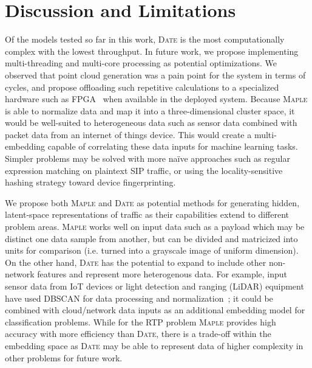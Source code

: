 \section{Discussion and Limitations}

Of the models tested so far in this work, \textsc{Date} is the most computationally complex with the lowest throughput. In future work, we propose implementing multi-threading and multi-core processing as potential optimizations. We observed that point cloud generation was a pain point for the system in terms of cycles, and propose offloading such repetitive calculations to a specialized hardware such as FPGA~\cite{Song2005EfficientPC} when available in the deployed system. Because \textsc{Maple} is able to normalize data and map it into a three-dimensional cluster space, it would be well-suited to heterogeneous data such as sensor data combined with packet data from an internet of things device. This would create a multi-embedding capable of correlating these data inputs for machine learning tasks. Simpler problems may be solved with more naïve approaches such as regular expression matching on plaintext SIP traffic, or using the locality-sensitive hashing strategy toward device fingerprinting.

We propose both \textsc{Maple} and \textsc{Date} as potential methods for generating hidden, latent-space representations of traffic as their capabilities extend to different problem areas. \textsc{Maple} works well on input data such as a payload which may be distinct one data sample from another, but can be divided and matricized into units for comparison (i.e. turned into a grayscale image of uniform dimension). On the other hand, \textsc{Date} has the potential to expand to include other non-network features and represent more heterogenous data. For example, input sensor data from IoT devices or light detection and ranging (LiDAR) equipment have used DBSCAN for data processing and normalization~\cite{wanglidar2019}; it could be combined with cloud/network data inputs as an additional embedding model for classification problems. While for the RTP problem \textsc{Maple} provides high accuracy with more efficiency than \textsc{Date}, there is a trade-off within the embedding space as \textsc{Date} may be able to represent data of higher complexity in other problems for future work.
